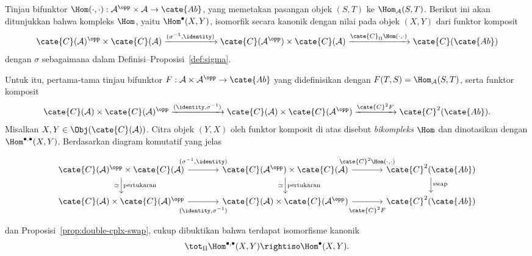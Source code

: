 \begin{contoh}\label{eg:Hom-bicplx}
	Tinjau bifunktor
	$\Hom(\cdot,\cdot):\mathcal{A}^{\opp}\times\mathcal{A}\to\cate{Ab}$,
	yang memetakan pasangan objek $(S,T)$ ke $\Hom_{\mathcal{A}}(S,T)$.
	Berikut ini akan ditunjukkan bahwa kompleks $\Hom$, yaitu
	$\Hom^\bullet(X,Y)$, isomorfik secara kanonik dengan nilai pada objek
	$(X,Y)$ dari funktor komposit
	\[ \cate{C}(\mathcal{A})^{\opp} \times \cate{C}(\mathcal{A}) \xrightarrow{(\sigma^{-1}, \identity)} \cate{C}(\mathcal{A}^{\opp}) \times \cate{C}(\mathcal{A}) \xrightarrow{\cate{C}_{\Pi} \Hom(\cdot, \cdot)} \cate{C}(\cate{Ab}) \]
	dengan $\sigma$ sebagaimana dalam
	Definisi--Proposisi~\ref{def:sigma}.

	Untuk itu, pertama-tama tinjau bifunktor
	$F:\mathcal{A}\times\mathcal{A}^{\opp}\to\cate{Ab}$ yang didefinisikan
	dengan $F(T,S)=\Hom_{\mathcal{A}}(S,T)$, serta funktor komposit
	\[ \cate{C}(\mathcal{A}) \times \cate{C}(\mathcal{A})^{\opp} \xrightarrow{(\identity, \sigma^{-1})} \cate{C}(\mathcal{A}) \times \cate{C}(\mathcal{A}^{\opp}) \xrightarrow{\cate{C}^2 F} \cate{C}^2(\cate{Ab}). \]
	Misalkan $X,Y\in\Obj(\cate{C}(\mathcal{A}))$. Citra objek $(Y,X)$ oleh
	funktor komposit di atas disebut \emph{bikompleks $\Hom$} dan dinotasikan
	dengan $\Hom^{\bullet,\bullet}(X,Y)$. Berdasarkan diagram komutatif yang
	jelas
	\[\begin{tikzcd}[column sep=large]
		\cate{C}(\mathcal{A})^{\opp} \times \cate{C}(\mathcal{A}) \arrow[d, "\simeq"', "\text{pertukaran}"] \arrow[r, "{(\sigma^{-1}, \identity)}" inner sep=0.6em] & \cate{C}(\mathcal{A}^{\opp}) \times \cate{C}(\mathcal{A}) \arrow[r, "{\cate{C}^2 \Hom(\cdot, \cdot)}" inner sep=0.6em] \arrow[d, "\simeq"', "\text{pertukaran}"] & \cate{C}^2(\cate{Ab}) \arrow[d, "\mathrm{swap}"] \\
		\cate{C}(\mathcal{A}) \times \cate{C}(\mathcal{A})^{\opp} \arrow[r, "{(\identity, \sigma^{-1})}"' inner sep=0.6em] & \cate{C}(\mathcal{A}) \times \cate{C}(\mathcal{A}^{\opp}) \arrow[r, "{\cate{C}^2 F}"' inner sep=0.6em] & \cate{C}^2(\cate{Ab})
	\end{tikzcd}\]
	dan Proposisi~\ref{prop:double-cplx-swap}, cukup dibuktikan bahwa terdapat
	isomorfisme kanonik
	\[
		\tot_{\Pi}\Hom^{\bullet,\bullet}(X,Y)
		\rightiso \Hom^\bullet(X,Y).
	\]
	

\end{contoh}

